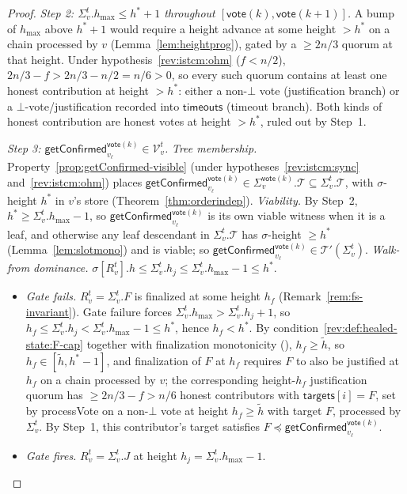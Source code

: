 \ifx\litemode\undefined\documentclass{article}\fi
\newcommand{\T}[0]{\ensuremath{\mathcal{T}}}
\newcommand{\V}[0]{\ensuremath{\mathcal{V}}}
\newcommand{\targets}{\mathsf{targets}}
\newcommand{\timeouts}{\mathsf{timeouts}}
\newcommand{\hmax}{\ensuremath{h_{\max}}\xspace}
\newcommand{\viableTree}{\ensuremath{\mathcal{T}'}}
\newcommand{\processVote}{\textsf{processVote}\xspace}
\newcommand{\vote}{\ensuremath{\mathsf{vote}}}
\newcommand{\comm}[1]{\ensuremath{\widetilde{#1}}}
\newcommand{\getConfirmed}{\textsf{getConfirmed}\xspace}
\theoremstyle{plain}
\theoremstyle{definition}
\theoremstyle{remark}
\begin{document}
\begin{proof}
\emph{Step 2: $\Sigma_v^t.\hmax \leq h^\ast + 1$ throughout $[\vote(k), \vote(k+1)]$.}
A bump of $\hmax$ above $h^\ast + 1$ would require a height advance at some height $> h^\ast$ on a chain processed by $v$ (Lemma~\ref{lem:heightprog}), gated by a $\geq 2n/3$ quorum at that height.
Under hypothesis~\ref{rev:istcm:ohm} ($f < n/2$), $2n/3 - f > 2n/3 - n/2 = n/6 > 0$, so every such quorum contains at least one honest contribution at height $> h^\ast$:
either a non-$\bot$ vote (justification branch) or a $\bot$-vote/justification recorded into $\timeouts$ (timeout branch).
Both kinds of honest contribution are honest votes at height $> h^\ast$, ruled out by Step~1.

\emph{Step 3: $\getConfirmed_{v_\ell}^{\vote(k)} \in \V_v^t$.}
\emph{Tree membership.}
Property~\ref{prop:getConfirmed-visible} (under hypotheses~\ref{rev:istcm:sync} and~\ref{rev:istcm:ohm}) places $\getConfirmed_{v_\ell}^{\vote(k)} \in \Sigma_v^{\vote(k)}.\T \subseteq \Sigma_v^t.\T$, with $\sigma$-height $h^\ast$ in $v$'s store (Theorem~\ref{thm:orderindep}).
\emph{Viability.}
By Step~2, $h^\ast \geq \Sigma_v^t.\hmax - 1$, so $\getConfirmed_{v_\ell}^{\vote(k)}$ is its own viable witness when it is a leaf, and otherwise any leaf descendant in $\Sigma_v^t.\T$ has $\sigma$-height $\geq h^\ast$ (Lemma~\ref{lem:slotmono}) and is viable;
so $\getConfirmed_{v_\ell}^{\vote(k)} \in \viableTree(\Sigma_v^t)$.
\emph{Walk-from dominance.}
$\sigma[R_v^t].h \leq \Sigma_v^t.h_j \leq \Sigma_v^t.\hmax - 1 \leq h^\ast$.
\begin{itemize}
  \item \emph{Gate fails.}
  $R_v^t = \Sigma_v^t.F$ is finalized at some height $h_f$ (Remark~\ref{rem:fs-invariant}).
  Gate failure forces $\Sigma_v^t.\hmax > \Sigma_v^t.h_j + 1$, so $h_f \leq \Sigma_v^t.h_j < \Sigma_v^t.\hmax - 1 \leq h^\ast$, hence $h_f < h^\ast$.
  By condition~\ref{rev:def:healed-state:F-cap} together with finalization monotonicity (), $h_f \geq \comm{h}$, so $h_f \in [\comm{h}, h^\ast - 1]$, and finalization of $F$ at $h_f$ requires $F$ to also be justified at $h_f$ on a chain processed by $v$;
  the corresponding height-$h_f$ justification quorum has $\geq 2n/3 - f > n/6$ honest contributors with $\targets[i] = F$, set by \processVote{} on a non-$\bot$ vote at height $h_f \geq \comm{h}$ with target $F$, processed by $\Sigma_v^t$.
  By Step~1, this contributor's target satisfies $F \preceq \getConfirmed_{v_\ell}^{\vote(k)}$.
  \item \emph{Gate fires.}
  $R_v^t = \Sigma_v^t.J$ at height $h_j = \Sigma_v^t.\hmax - 1$.

\end{itemize}
\end{proof}
\end{document}
